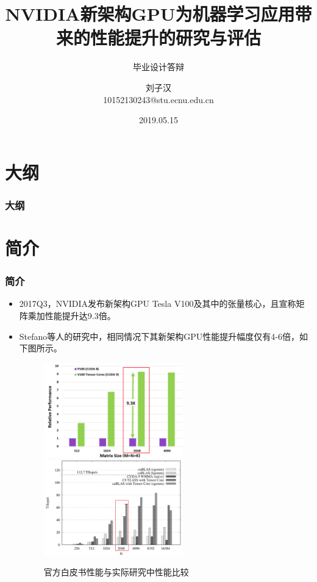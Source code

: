 \documentclass[10pt,aspectratio=169,mathserif]{beamer}
\title{NVIDIA新架构GPU为机器学习应用带来的性能提升的研究与评估}
\subtitle{毕业设计答辩}
\author[Altair Liu]{
	刘子汉 \\
	{\small {10152130243@stu.ecnu.edu.cn}}
}
\institute[ECNU]{
	华东师范大学 \\
	计算机科学与软件工程学院\\
	计算机科学与技术系
}
\date[2019.05.15]{
	2019.05.15
}
\begin{document}
	\begin{frame}
	\titlepage
	\end{frame}

	\section{大纲}
	\begin{frame}
		\frametitle{大纲}
		\tableofcontents
	\end{frame}

	\section{简介}
	\begin{frame}
		\frametitle{简介}
		\begin{itemize}
			\item 2017Q3，NVIDIA发布新架构GPU Tesla V100及其中的张量核心，且宣称矩阵乘加性能提升达9.3倍。
			\item Stefano等人的研究中，相同情况下其新架构GPU性能提升幅度仅有4-6倍，如下图所示。
			\begin{figure}
				\centering
				\includegraphics[width=6cm]{figures/VoltaGemmPerf.jpg}
				\includegraphics[width=6cm]{figures/ActualGemmPerf.jpg}
				\caption{官方白皮书性能与实际研究中性能比较}\label{Fig.COMPARE}
			\end{figure}
		\end{itemize}
	\end{frame}
\end{document}
